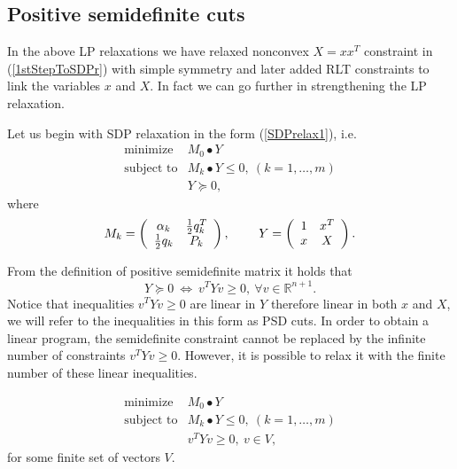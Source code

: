 \documentclass[12pt]{book}
\theoremstyle{definition}
\begin{document}
\subsection{Positive semidefinite cuts}

In the above LP relaxations we have relaxed nonconvex $X = xx^T$ constraint in (\ref{1stStepToSDPr}) with simple symmetry and later added RLT constraints to link the variables $x$ and $X$. In fact we can go further in strengthening the LP relaxation. 

Let us begin with SDP relaxation in the form (\ref{SDPrelax1}), i.e. 
\begin{equation} 
\begin{array}{ll}
\mbox{minimize}& M_0\bullet Y \\
\mbox{subject to}& M_k\bullet Y \leq 0, \  (k = 1,\dots ,m)\\
& Y\succeq 0,
\end{array} 
\end{equation}
where 
\begin{equation}
M_k = \left(
\begin{array}{cc}
\alpha_k & {1\over 2}q_k^T \\
{1\over 2}q_k & P_k
\end{array}\right), 
\ \ \ \ \ \ \
Y =  \left(
\begin{array}{cc}
1 & x^T \\
x & X
\end{array}\right).
\end{equation}

From the definition of positive semidefinite matrix it holds that
\begin{equation}
Y\succeq 0 \ \Leftrightarrow \ v^TYv \geq 0, \ \forall v\in\mathbb{R}^{n+1}.
\end{equation}
Notice that inequalities $ v^TYv \geq 0$ are linear in $Y$ therefore linear in both $x$ and $X$, we will refer to the inequalities in this form as PSD cuts.
In order to obtain a linear program, the semidefinite constraint cannot be replaced by the infinite number of constraints  $v^TYv \geq 0$.
However, it is possible to relax it with the finite number of these linear inequalities. 

\begin{equation}
\label{PSDcutsLPrelax} 
\begin{array}{ll}
\mbox{minimize}& M_0\bullet Y \\
\mbox{subject to}& M_k\bullet Y \leq 0, \  (k = 1,\dots ,m)\\
& v^TYv\geq 0, \ v\in V,
\end{array} 
\end{equation}
for some finite set of vectors $V$.
\end{document}
